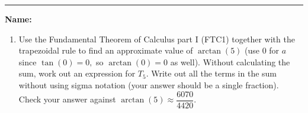 \documentclass[11pt]{article}
\newcommand{\red}{\textcolor{red}}
\newcommand{\bas}[1]{\begin{align*}{#1}\end{align*}}
\begin{document}
    \hrule
    \vspace{.5cm}
    \noindent\textbf{Name:} \underline{\qquad\qquad\qquad\qquad\qquad\qquad\qquad\qquad\qquad\qquad\qquad\qquad\qquad}

    \begin{enumerate}
        \item Use the Fundamental Theorem of Calculus part I (FTC1) together with the trapezoidal rule to find an approximate value of $\arctan(5)$ (use 0 for $a$ since $\tan(0)=0,$ so $\arctan(0)=0$ as well). Without calculating the sum, work out an expression for $T_5$. Write out all the terms in the sum without using sigma notation (your answer should be a single fraction). Check your answer against $\arctan(5)\approx\dfrac{6070}{4420}$.\vfill


        

\end{enumerate}
\end{document}
